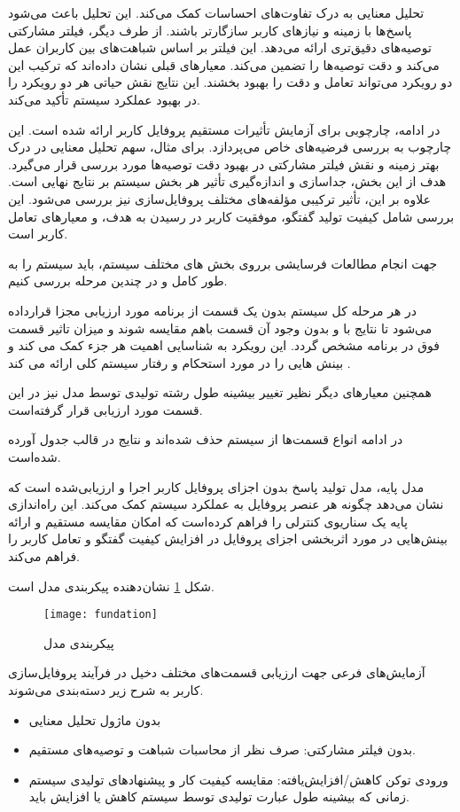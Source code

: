 تحلیل معنایی به درک تفاوت‌های احساسات کمک می‌کند. این تحلیل باعث می‌شود پاسخ‌ها با زمینه و نیازهای کاربر سازگارتر باشند. از طرف دیگر، فیلتر مشارکتی توصیه‌های دقیق‌تری ارائه می‌دهد. این فیلتر بر اساس شباهت‌های بین کاربران عمل می‌کند و دقت توصیه‌ها را تضمین می‌کند.
معیارهای قبلی نشان داده‌اند که ترکیب این دو رویکرد می‌تواند تعامل و دقت را بهبود بخشند. این نتایج نقش حیاتی هر دو رویکرد را در بهبود عملکرد سیستم تأکید می‌کند.

در ادامه، چارچوبی برای آزمایش تأثیرات مستقیم پروفایل کاربر ارائه شده است. این چارچوب به بررسی فرضیه‌های خاص می‌پردازد. برای مثال، سهم تحلیل معنایی در درک بهتر زمینه و نقش فیلتر مشارکتی در بهبود دقت توصیه‌ها مورد بررسی قرار می‌گیرد.
هدف از این بخش، جداسازی و اندازه‌گیری تأثیر هر بخش سیستم بر نتایج نهایی است. علاوه بر این، تأثیر ترکیبی مؤلفه‌های مختلف پروفایل‌سازی نیز بررسی می‌شود. این بررسی شامل کیفیت تولید گفتگو، موفقیت کاربر در رسیدن به هدف، و معیارهای تعامل کاربر است.

جهت انجام مطالعات فرسایشی%
 برروی بخش های مختلف سیستم، باید سیستم را به طور کامل و در چندین مرحله بررسی کنیم.

در هر مرحله کل سیستم بدون یک قسمت از برنامه مورد ارزیابی مجزا قرارداده می‌شود تا نتایج با و بدون وجود آن قسمت باهم مقایسه شوند و میزان تاثیر قسمت فوق در برنامه مشخص گردد. این رویکرد به شناسایی اهمیت هر جزء کمک می کند و بینش هایی را در مورد استحکام و رفتار سیستم کلی ارائه می کند %
\cite{na2024scalable}
.

همچنین معیارهای دیگر نظیر تغییر بیشینه طول رشته تولیدی توسط مدل نیز در این قسمت مورد ارزیابی قرار گرفته‌است.

در ادامه انواع قسمت‌ها از سیستم حذف شده‌اند و نتایج در قالب جدول آورده شده‌است.


مدل پایه، مدل تولید پاسخ بدون اجزای پروفایل کاربر اجرا و ارزیابی‌شده است که نشان می‌د‌هد چگونه هر عنصر پروفایل به عملکرد سیستم کمک می‌کند. این راه‌اندازی پایه یک سناریوی کنترلی را فراهم کرده‌است که امکان مقایسه مستقیم و ارائه بینش‌هایی در مورد اثربخشی اجزای پروفایل در افزایش کیفیت گفتگو و تعامل کاربر را فراهم می‌کند.

شکل%
\ref{fig:fundation}
نشان دهنده پیکربندی مدل است.


\begin{figure}[ht]
	\centerline{\texttt{[image: fundation]}}
	\caption{پیکربندی مدل}
	\label{fig:fundation}
\end{figure}

آزمایش‌های فرعی جهت ارزیابی قسمت‌های مختلف دخیل در فرآیند پروفایل‌سازی کاربر به شرح زیر دسته‌بندی می‌شوند.
\begin{itemize}
\item
بدون ماژول تحلیل معنایی
\item
بدون فیلتر مشارکتی: صرف نظر از محاسبات شباهت و توصیه‌های مستقیم.
\item
ورودی توکن کاهش/افزایش‌یافته: مقایسه کیفیت کار و پیشنهادهای تولیدی سیستم زمانی که بیشینه طول عبارت تولیدی توسط سیستم کاهش یا افزایش باید.
\end{itemize}

